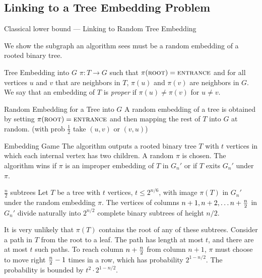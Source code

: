 \documentclass{beamer}
\newcommand{\<}{\langle}
\renewcommand{\>}{\rangle}
\newcommand{\ent}{{\textsc{entrance}}}
\renewcommand{\root}{{\textsc{root}}}
\begin{document}
\subsection{Linking to a Tree Embedding Problem}\label{classical:tree embedding}

\begin{frame}[allowframebreaks]{Classical lower bound --- Linking to Random Tree Embedding}

We show the subgraph an algorithm sees must be a random embedding of a rooted binary tree.

\begin{block}{Tree Embedding into $G$}
 $\pi : T \to G$ such that $\pi(\root) = \ent$ and for all vertices $u$ and $v$ that are neighbors in $T$, $\pi(u)$ and $\pi(v)$ are neighbors in $G$.
We say that an embedding of $T$ is {\em proper} if $\pi(u) \not = \pi(v)$ for $u \ne v$.
\end{block}

\begin{block}{Random Embedding for a Tree into $G$}
A random embedding of a tree is obtained by setting $\pi(\root) = \ent$ and then mapping the rest of $T$ into $G$ at random. (with prob $\frac12$ take $(u,v)$ or $(v,u)$)
\end{block}
\framebreak

\begin{block}{Embedding Game}\label{game:randomembedding}
The algorithm outputs a rooted binary tree $T$ with $t$ vertices in
which each internal vertex has two children.  A random $\pi$ is chosen.
The algorithm wins if $\pi$ is an improper embedding of $T$ in $G_n'$ or
if $T$ exits $G_n'$ under $\pi$.
\end{block}

\framebreak

\begin{block}{$\frac n2$ subtrees}
Let $T$ be a tree with $t$ vertices, $t \le 2^{n/6}$, with image $\pi(T)$
in $G_n'$ under the random embedding $\pi$.  The vertices of columns $n+1, n+2,
\ldots n+{n \over 2}$ in $G_n'$ divide naturally into $2^{n/2}$ complete
binary subtrees of height $n/2$.
\end{block}

It is very unlikely that $\pi(T)$ contains the root of any of these subtrees.  Consider a path in $T$ from the root to a leaf.  The path has length at most $t$, and there are at most $t$ such paths.  To reach column $n+{n\over 2}$ from column $n+1$, $\pi$ must choose to move right ${n \over
2}-1$ times in a row, which has probability $2^{1-n/2}$. The probability is bounded by
$t^2 \cdot 2^{1-n/2}$.


\end{frame}
\end{document}

